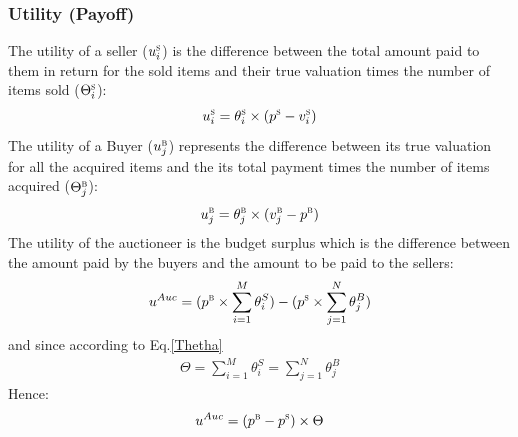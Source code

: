 \subsubsection{Utility (Payoff)}
The utility of a seller ($u_{i}^\textsc{s}$) is the difference between the total amount paid to them in return for the sold items and their true valuation times the number of items sold ($\Theta_{i}^\textsc{s}$):
\begin{equation}
\label{seller_utility_formula}
u_{i}^\textsc{s} = {\theta_{i}^\textsc{s}}  \times (p^\textsc{s} - {v_{i}^\textsc{s}})
\end{equation}
The utility of a Buyer ($u_{j}^\textsc{b}$) represents the difference between its true valuation for all the acquired items and the its total payment times the number of items acquired ($\Theta_{j}^\textsc{b}$):
\begin{equation}
\label{buyer-utility-formula}
u_{j}^\textsc{b} = {\theta_{j}^\textsc{b}}  \times ({v_{j}^\textsc{b}}-p^\textsc{b})
\end{equation}
The utility of the auctioneer is the budget surplus which is the difference between the amount paid by the buyers and the amount to be paid to the sellers:
\begin{equation}
\label{util-auc}
u^{Auc} = (p^\textsc{b} \times \sum_{i=1}^{M} \theta_i^S) - (p^\textsc{s} \times \sum_{j=1}^{N} \theta_j^B)
\end{equation}
and since according to Eq.\ref{Thetha}
\begin{eqnarray*}
\Theta = \sum_{i=1}^{M} \theta_i^S = \sum_{j=1}^{N} \theta_j^B
\end{eqnarray*}
Hence:
\begin{eqnarray}
u^{Auc} = (p^\textsc{b} - p^\textsc{s}) \times \Theta
\end{eqnarray}




